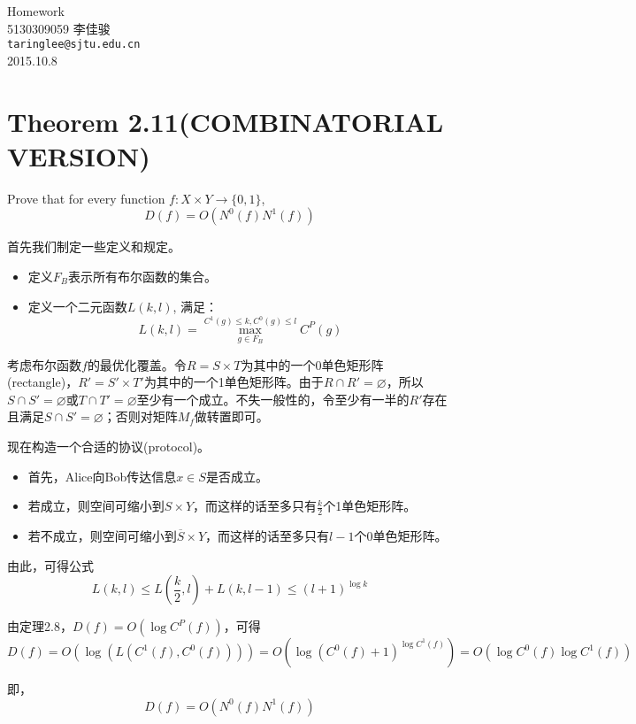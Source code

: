 \documentclass[13pt, fleqn, a4paper]{report}
\begin{document}
\begin{titlepage}
\vspace*{40mm}
\begin{center}
{\Huge Homework }\\[30mm]

{\Large 5130309059 \quad \quad 李佳骏}\\[3mm]
\texttt{taringlee@sjtu.edu.cn}\\[10mm]

2015.10.8

\end{center}
\end{titlepage}

\section*{Theorem 2.11(COMBINATORIAL VERSION)}
Prove that for every function $f : X \times Y \rightarrow \{0,1\}$, $$D(f) = O(N^0(f)N^1(f))$$

首先我们制定一些定义和规定。
\begin{itemize}
\item 定义$F_B$表示所有布尔函数的集合。
\item 定义一个二元函数$L(k,l)$, 满足：$$L(k,l) = \max_{g \in F_B}^{C^1(g) \leq k, C^0(g) \leq l}{C^P(g)}$$
\end{itemize}
考虑布尔函数$f$的最优化覆盖。令$R = S \times T$为其中的一个0单色矩形阵(rectangle)，$R' = S' \times T'$为其中的一个1单色矩形阵。由于$R \cap R' = \varnothing$，所以$S \cap S' = \varnothing$或$T \cap T' = \varnothing$至少有一个成立。不失一般性的，令至少有一半的$R'$存在且满足$S \cap S' = \varnothing$；否则对矩阵$M_f$做转置即可。

现在构造一个合适的协议(protocol)。
\begin{itemize}
\item 首先，Alice向Bob传达信息$x \in S$是否成立。
\item 若成立，则空间可缩小到$S \times Y$，而这样的话至多只有$\frac{k}{2}$个1单色矩形阵。
\item 若不成立，则空间可缩小到$\overline{S} \times Y$，而这样的话至多只有$l - 1$个0单色矩形阵。
\end{itemize}
由此，可得公式$$L(k,l) \leq L(\frac{k}{2}, l) + L(k, l - 1) \leq (l + 1)^{\log{k}}$$

由定理2.8，$D(f) = O(\log{C^P( f ) })$，可得$$D(f) = O(\log{(L(C^1(f),C^0(f)))}) = O(\log{(C^0(f) + 1)^{\log{C^1(f)}}}) = O(\log{C^0(f)}\log{C^1(f)})$$

即，$$D(f) = O(N^0(f)N^1(f))$$
\end{document}
